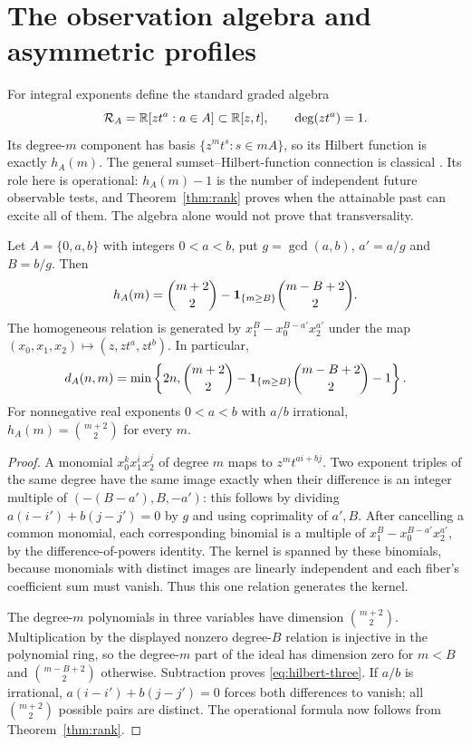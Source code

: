 \section{The observation algebra and asymmetric profiles}\label{sec:algebra}
For integral exponents define the standard graded algebra
\[
 \mathcal R_A=\mathbb R[z t^a:a\in A]\subset\mathbb R[z,t],\qquad \deg(zt^a)=1.
\]
Its degree-$m$ component has basis $\{z^m t^s:s\in mA\}$, so its
Hilbert function is exactly $h_A(m)$. The general sumset--Hilbert-function
connection is classical \cite{EliahouMazumdar,Elias}. Its role here is
operational: $h_A(m)-1$ is the number of independent future observable
tests, and Theorem~\ref{thm:rank} proves when the attainable past can
excite all of them. The algebra alone would not prove that transversality.

\begin{proposition}\label{prop:three}
Let $A=\{0,a,b\}$ with integers $0<a<b$, put
$g=\gcd(a,b)$, $a'=a/g$ and $B=b/g$. Then
\begin{equation}\label{eq:hilbert-three}
 h_A(m)=\binom{m+2}{2}
       -\mathbf 1_{\{m\ge B\}}\binom{m-B+2}{2}.
\end{equation}
The homogeneous relation is generated by
$x_1^B-x_0^{B-a'}x_2^{a'}$ under the map
$(x_0,x_1,x_2)\mapsto(z,zt^a,zt^b)$. In particular,
\[
 d_A(n,m)=\min\left\{2n,
 \binom{m+2}{2}-\mathbf 1_{\{m\ge B\}}\binom{m-B+2}{2}-1\right\}.
\]
For nonnegative real exponents $0<a<b$ with $a/b$ irrational,
$h_A(m)=\binom{m+2}{2}$ for every $m$.
\end{proposition}
\begin{proof}
A monomial $x_0^kx_1^ix_2^j$ of degree $m$ maps to $z^m t^{ai+bj}$.
Two exponent triples of the same degree have the same image exactly when
their difference is an integer multiple of
$(-(B-a'),B,-a')$: this follows by dividing
$a(i-i')+b(j-j')=0$ by $g$ and using coprimality of $a',B$.
After cancelling a common monomial, each corresponding binomial is a
multiple of $x_1^B-x_0^{B-a'}x_2^{a'}$, by the difference-of-powers
identity. The kernel is spanned by these binomials, because monomials
with distinct images are linearly independent and each fiber's coefficient
sum must vanish. Thus this one relation generates the kernel.

The degree-$m$ polynomials in three variables have dimension
$\binom{m+2}{2}$. Multiplication by the displayed nonzero degree-$B$
relation is injective in the polynomial ring, so the degree-$m$ part of
the ideal has dimension zero for $m<B$ and
$\binom{m-B+2}{2}$ otherwise. Subtraction proves
\eqref{eq:hilbert-three}. If $a/b$ is irrational,
$a(i-i')+b(j-j')=0$ forces both differences to vanish; all
$\binom{m+2}{2}$ possible pairs are distinct. The operational formula
now follows from Theorem~\ref{thm:rank}.
\end{proof}

